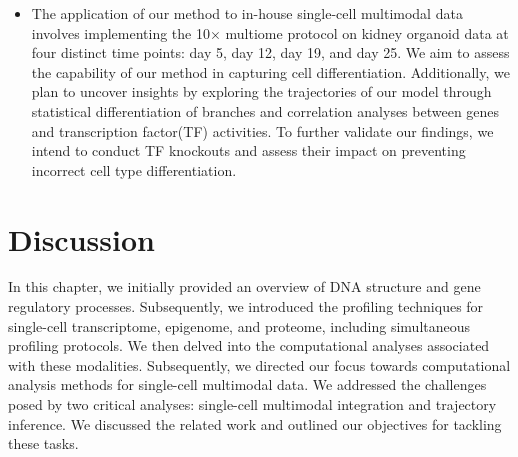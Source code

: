 \begin{itemize}
	\item The application of our method to in-house single-cell multimodal data involves implementing the 10$\times$ multiome protocol on kidney organoid data at four distinct time points: day 5, day 12, day 19, and day 25. We aim to assess the capability of our method in capturing cell differentiation. Additionally, we plan to uncover insights by exploring the trajectories of our model through statistical differentiation of branches and correlation analyses between genes and transcription factor(TF) activities. To further validate our findings, we intend to conduct TF knockouts and assess their impact on preventing incorrect cell type differentiation.

\end{itemize}


\section{Discussion}
\label{background:Discussion}
In this chapter, we initially provided an overview of DNA structure and gene regulatory processes. Subsequently, we introduced the profiling techniques for single-cell transcriptome, epigenome, and proteome, including simultaneous profiling protocols. We then delved into the computational analyses associated with these modalities. Subsequently, we directed our focus towards computational analysis methods for single-cell multimodal data. We addressed the challenges posed by two critical analyses: single-cell multimodal integration and trajectory inference. We discussed the related work and outlined our objectives for tackling these tasks.
